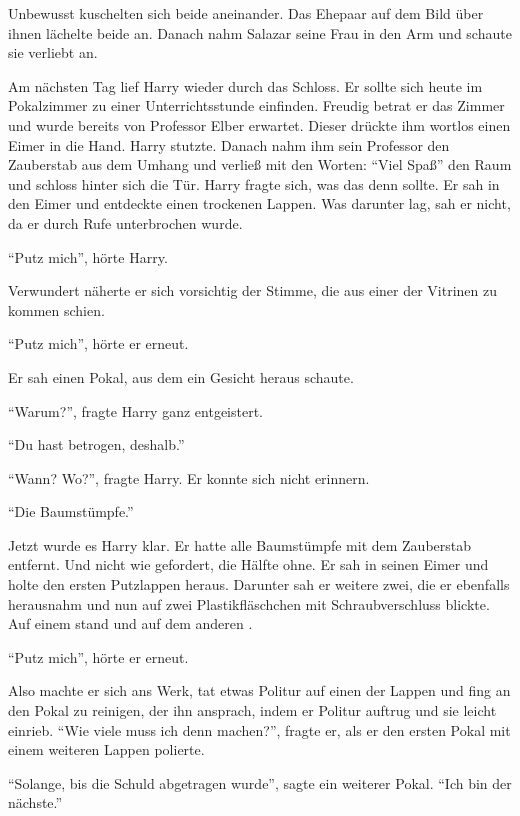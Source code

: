 Unbewusst kuschelten sich beide aneinander. Das Ehepaar auf dem Bild über ihnen lächelte beide an. Danach nahm Salazar seine Frau in den Arm und schaute sie verliebt an.

Am nächsten Tag lief Harry wieder durch das Schloss. Er sollte sich heute im Pokalzimmer zu einer Unterrichtsstunde einfinden. Freudig betrat er das Zimmer und wurde bereits von Professor Elber erwartet. Dieser drückte ihm wortlos einen Eimer in die Hand. Harry stutzte. Danach nahm ihm sein Professor den Zauberstab aus dem Umhang und verließ mit den Worten: \enquote{Viel Spaß} den Raum und schloss hinter sich die Tür. Harry fragte sich, was das denn sollte. Er sah in den Eimer und entdeckte einen trockenen Lappen. Was darunter lag, sah er nicht, da er durch Rufe unterbrochen wurde.

\enquote{Putz mich}, hörte Harry.

Verwundert näherte er sich vorsichtig der Stimme, die aus einer der Vitrinen zu kommen schien.

\enquote{Putz mich}, hörte er erneut.

Er sah einen Pokal, aus dem ein Gesicht heraus schaute.

\enquote{Warum?}, fragte Harry ganz entgeistert.

\enquote{Du hast betrogen, deshalb.}

\enquote{Wann? Wo?}, fragte Harry. Er konnte sich nicht erinnern.

\enquote{Die Baumstümpfe.}

Jetzt wurde es Harry klar. Er hatte alle Baumstümpfe mit dem Zauberstab entfernt. Und nicht wie gefordert, die Hälfte ohne. Er sah in seinen Eimer und holte den ersten Putzlappen heraus. Darunter sah er weitere zwei, die er ebenfalls herausnahm und nun auf zwei Plastikfläschchen mit Schraubverschluss blickte. Auf einem stand   und auf dem anderen .

\enquote{Putz mich}, hörte er erneut.

Also machte er sich ans Werk, tat etwas Politur auf einen der Lappen und fing an den Pokal zu reinigen, der ihn ansprach, indem er Politur auftrug und sie leicht einrieb. \enquote{Wie viele muss ich denn machen?}, fragte er, als er den ersten Pokal mit einem weiteren Lappen polierte.

\enquote{Solange, bis die Schuld abgetragen wurde}, sagte ein weiterer Pokal. \enquote{Ich bin der nächste.}

